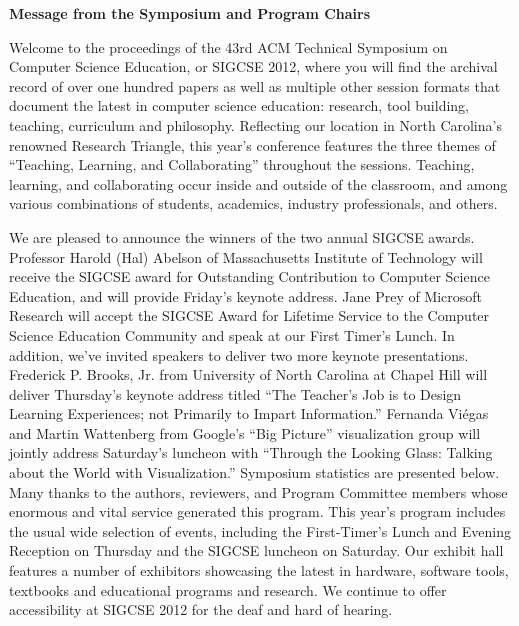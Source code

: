 

% 
\newpage
\begin{center}
{\Large \textbf{\textsf{Message from the Symposium and Program Chairs}}}
\end{center}

Welcome to the proceedings of the 43rd ACM Technical Symposium on Computer Science Education, or SIGCSE 2012, where you will find the archival record of over one hundred papers as well as multiple other session formats that document the latest in computer science education: research, tool building, teaching, curriculum and philosophy. Reflecting our location in North Carolina’s renowned Research Triangle, this year’s conference features the three themes of “Teaching, Learning, and Collaborating” throughout the sessions. Teaching, learning, and collaborating occur inside and outside of the classroom, and among various combinations of students, academics, industry professionals, and others.
\vspace{0.5\baselineskip}

We are pleased to announce the winners of the two annual SIGCSE awards. Professor Harold (Hal) Abelson of Massachusetts Institute of Technology will receive the SIGCSE award for Outstanding Contribution to Computer Science Education, and will provide Friday’s keynote address. Jane Prey of Microsoft Research will accept the SIGCSE Award for Lifetime Service to the Computer Science Education Community and speak at our First Timer’s Lunch. In addition, we’ve invited speakers to deliver two more keynote presentations. Frederick P. Brooks, Jr. from University of North Carolina at Chapel Hill will deliver Thursday’s keynote address titled “The Teacher’s Job is to Design Learning Experiences; not Primarily to Impart Information.” Fernanda Viégas and Martin Wattenberg from Google’s “Big Picture” visualization group will jointly address Saturday’s luncheon with “Through the Looking Glass: Talking about the World with Visualization.” Symposium statistics are presented below. Many thanks to the authors, reviewers, and Program Committee members whose enormous and vital service generated this program. This year’s program includes the usual wide selection of events, including the First-Timer’s Lunch and Evening Reception on Thursday and the SIGCSE luncheon on Saturday. Our exhibit hall features a number of exhibitors showcasing the latest in hardware, software tools, textbooks and educational programs and research. We continue to offer accessibility at SIGCSE 2012 for the deaf and hard of hearing. 
\vspace{0.5\baselineskip}

